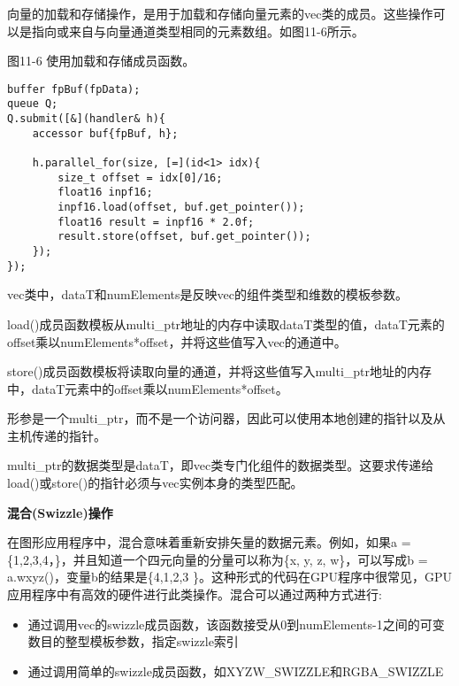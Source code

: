 向量的加载和存储操作，是用于加载和存储向量元素的vec类的成员。这些操作可以是指向或来自与向量通道类型相同的元素数组。如图11-6所示。\par

\hspace*{\fill} \par %
图11-6 使用加载和存储成员函数。
\begin{lstlisting}[caption={}]
buffer fpBuf(fpData);
queue Q;
Q.submit([&](handler& h){
	accessor buf{fpBuf, h};
	
	h.parallel_for(size, [=](id<1> idx){
		size_t offset = idx[0]/16;
		float16 inpf16;
		inpf16.load(offset, buf.get_pointer());
		float16 result = inpf16 * 2.0f;
		result.store(offset, buf.get_pointer());
	});
});
\end{lstlisting}

vec类中，dataT和numElements是反映vec的组件类型和维数的模板参数。\par

load()成员函数模板从multi\_ptr地址的内存中读取dataT类型的值，dataT元素的offset乘以numElements*offset，并将这些值写入vec的通道中。\par

store()成员函数模板将读取向量的通道，并将这些值写入multi\_ptr地址的内存中，dataT元素中的offset乘以numElements*offset。\par

形参是一个multi\_ptr，而不是一个访问器，因此可以使用本地创建的指针以及从主机传递的指针。\par

multi\_ptr的数据类型是dataT，即vec类专门化组件的数据类型。这要求传递给load()或store()的指针必须与vec实例本身的类型匹配。\par

\hspace*{\fill} \par %
\textbf{混合(Swizzle)操作}

在图形应用程序中，混合意味着重新安排矢量的数据元素。例如，如果a = \{1,2,3,4，\}，并且知道一个四元向量的分量可以称为\{x, y, z, w\}，可以写成b = a.wxyz()，变量b的结果是\{4,1,2,3 \}。这种形式的代码在GPU程序中很常见，GPU应用程序中有高效的硬件进行此类操作。混合可以通过两种方式进行:\par

\begin{itemize}
	\item 通过调用vec的swizzle成员函数，该函数接受从0到numElements-1之间的可变数目的整型模板参数，指定swizzle索引
	\item 通过调用简单的swizzle成员函数，如XYZW\_SWIZZLE和RGBA\_SWIZZLE
\end{itemize}

